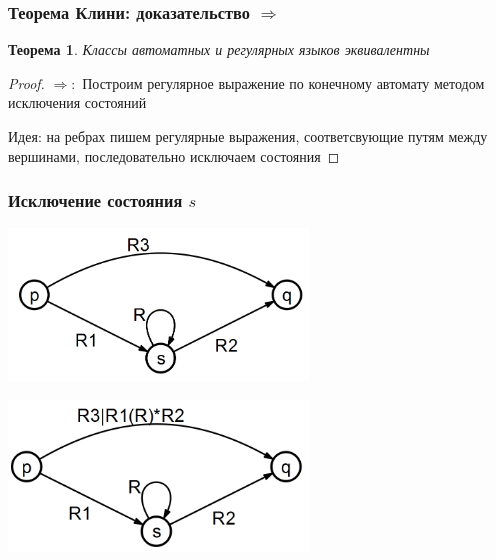 \documentclass{beamer}
\newtheorem{rutheorem}{Теорема}
\begin{document}
\begin{frame}
  \transwipe[direction=90]
  \frametitle{Теорема Клини: доказательство $\Rightarrow$}
  
  \begin{rutheorem}
   Классы автоматных и регулярных языков \emph{эквивалентны}
  \end{rutheorem}
  
  \begin{proof} 
   $\Rightarrow: $
    Построим регулярное выражение по конечному автомату методом исключения состояний
    
    Идея: на ребрах пишем регулярные выражения, соответсвующие путям между вершинами, последовательно исключаем состояния   
    
  \end{proof}
\end{frame}

\begin{frame}
  \transwipe[direction=90]
  \frametitle{Исключение состояния $s$}
    \begin{center}
      \includegraphics[width=0.60\textwidth]{pics/elim.png}  
      
      \includegraphics[width=0.60\textwidth]{pics/elim2.png}  
    \end{center}
\end{frame}
\end{document}
